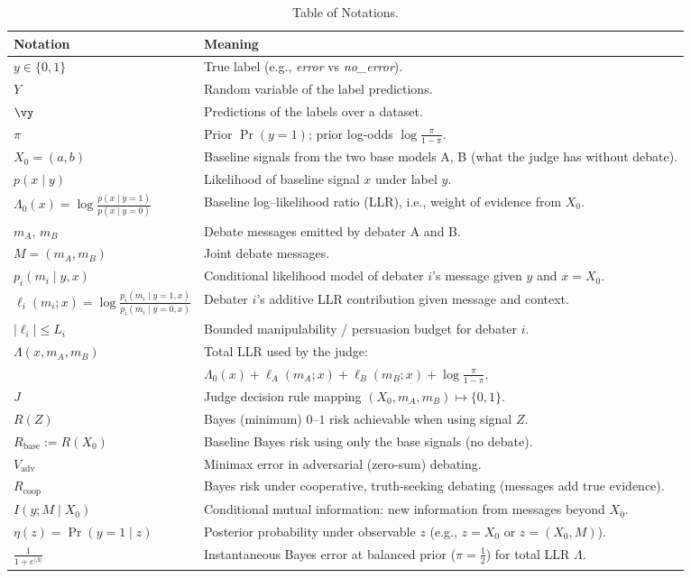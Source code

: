 \documentclass{article} %
\begin{document}
\begin{table}[ht]\label{tab:notation}
\centering
\small
\caption{Table of Notations.}
\begin{tabular}{ll}
\toprule
\textbf{Notation} & \textbf{Meaning} \\
\midrule
$y\in\{0,1\}$ & True label (e.g., \textit{error} vs \textit{no\_error}). \\
$Y$ & Random variable of the label predictions. \\
$\vy$ & Predictions of the labels over a dataset. \\
$\pi$ & Prior $\Pr(y=1)$; prior log-odds $\log\frac{\pi}{1-\pi}$. \\
$X_0=(a,b)$ & Baseline signals from the two base models A, B (what the judge has without debate). \\
$p(x\mid y)$ & Likelihood of baseline signal $x$ under label $y$. \\
$\Lambda_0(x)=\log\frac{p(x\mid y=1)}{p(x\mid y=0)}$ & Baseline log–likelihood ratio (LLR), i.e., weight of evidence from $X_0$. \\
$m_A,\,m_B$ & Debate messages emitted by debater A and B. \\
$M=(m_A,m_B)$ & Joint debate messages. \\
$p_i(m_i\mid y,x)$ & Conditional likelihood model of debater $i$'s message given $y$ and $x=X_0$. \\
$\ell_i(m_i;x)=\log\frac{p_i(m_i\mid y=1,x)}{p_i(m_i\mid y=0,x)}$ & Debater $i$'s additive LLR contribution given message and context. \\
$|\ell_i|\le L_i$ & Bounded manipulability / persuasion budget for debater $i$. \\
$\Lambda(x,m_A,m_B)$ & Total LLR used by the judge: \\
& $\displaystyle \Lambda_0(x)+\ell_A(m_A;x)+\ell_B(m_B;x)+\log\frac{\pi}{1-\pi}$. \\
$J$ & Judge decision rule mapping $(X_0,m_A,m_B)\mapsto\{0,1\}$. \\
$R(Z)$ & Bayes (minimum) $0$–$1$ risk achievable when using signal $Z$. \\
$R_\mathrm{base}:=R(X_0)$ & Baseline Bayes risk using only the base signals (no debate). \\
$V_\mathrm{adv}$ & Minimax error in adversarial (zero-sum) debating. \\
$R_\mathrm{coop}$ & Bayes risk under cooperative, truth-seeking debating (messages add true evidence). \\
$I(y;M\mid X_0)$ & Conditional mutual information: new information from messages beyond $X_0$. \\
$\eta(z)=\Pr(y=1\mid z)$ & Posterior probability under observable $z$ (e.g., $z=X_0$ or $z=(X_0,M)$). \\
$\frac{1}{1+e^{|\Lambda|}}$ & Instantaneous Bayes error at balanced prior ($\pi=\tfrac12$) for total LLR $\Lambda$. \\
\bottomrule
\end{tabular}
\end{table}
\end{document}
